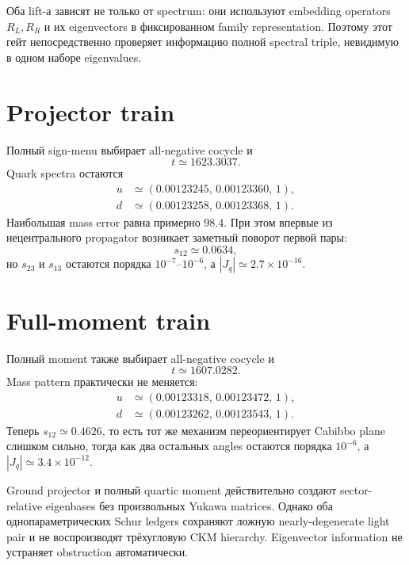 \begin{proposition}
Оба lift-а зависят не только от spectrum: они используют embedding operators
\(R_L,R_R\) и их eigenvectors в фиксированном family representation. Поэтому
этот гейт непосредственно проверяет информацию полной spectral triple,
невидимую в одном наборе eigenvalues.
\end{proposition}

\section{Projector train}

Полный sign-menu выбирает all-negative cocycle и
\begin{equation}
 t\simeq1623.3037.
\end{equation}
Quark spectra остаются
\begin{align}
 u&\simeq(0.00123245,\,0.00123360,\,1),\\
 d&\simeq(0.00123258,\,0.00123368,\,1).
\end{align}
Наибольшая mass error равна примерно \(98.4\). При этом впервые из
нецентрального propagator возникает заметный поворот первой пары:
\begin{equation}
 s_{12}\simeq0.0634,
\end{equation}
но \(s_{23}\) и \(s_{13}\) остаются порядка \(10^{-7}\)--\(10^{-6}\), а
\(|J_q|\simeq2.7\times10^{-16}\).

\section{Full-moment train}

Полный moment также выбирает all-negative cocycle и
\begin{equation}
 t\simeq1607.0282.
\end{equation}
Mass pattern практически не меняется:
\begin{align}
 u&\simeq(0.00123318,\,0.00123472,\,1),\\
 d&\simeq(0.00123262,\,0.00123543,\,1).
\end{align}
Теперь \(s_{12}\simeq0.4626\), то есть тот же механизм переориентирует
Cabibbo plane слишком сильно, тогда как два остальных angles остаются
порядка \(10^{-6}\), а \(|J_q|\simeq3.4\times10^{-12}\).

\begin{theorem}
Ground projector и полный quartic moment действительно создают
sector-relative eigenbases без произвольных Yukawa matrices. Однако оба
однопараметрических Schur ledgers сохраняют ложную nearly-degenerate light
pair и не воспроизводят трёхугловую CKM hierarchy. Eigenvector information
не устраняет obstruction автоматически.
\end{theorem}


